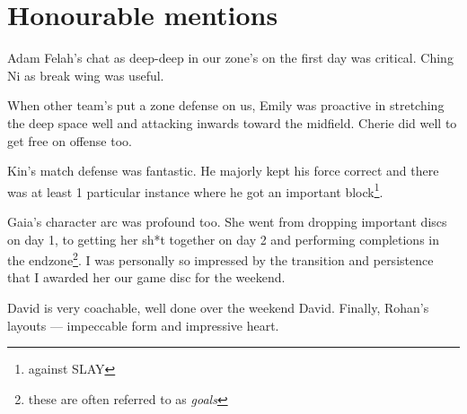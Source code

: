 \documentclass[12pt]{article}
\begin{document}
\section{Honourable mentions}
Adam Felah's chat as deep-deep in our zone's on the first day was critical. Ching Ni as break wing was useful.

When other team's put a zone defense on us, Emily was proactive in stretching the deep space well and attacking inwards toward the midfield. Cherie did well to get free on offense too.

Kin's match defense was fantastic. He majorly kept his force correct and there was at least 1 particular instance where he got an important block\footnote{against SLAY}.

Gaia's character arc was profound too. She went from dropping important discs on day 1, to getting her sh*t together on day 2 and performing completions in the endzone\footnote{these are often referred to as \emph{goals}}. I was personally so impressed by the transition and persistence that I awarded her our game disc for the weekend.

David is very coachable, well done over the weekend David.
Finally, Rohan's layouts --- impeccable form and impressive heart.
 
\end{document}
